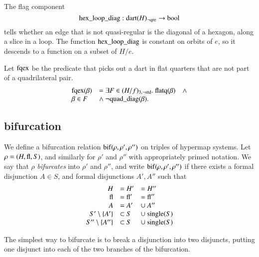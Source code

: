 \begin{definition}
The flag component
    $$
    {\operatorname{hex\_loop\_diag}}:{\operatorname{dart}}(H)_{\neg{\operatorname{qre}}}\to\operatorname{bool}
    $$
tells whether an edge that is not quasi-regular is the diagonal of
a hexagon, along a slice in a loop.  The function
${\operatorname{hex\_loop\_diag}}$ is constant on orbits of $e$, so it
descends to a function on a subset of $H/e$.
\end{definition}


\begin{definition}[$\op{fqex}$]
Let $\op{fqex}$ be the predicate that picks out a dart in flat
quarters that are not part of a quadrilateral pair.
\begin{equation}
    \begin{array}{llll}
    \op{fqex}(\beta) &= \exists F\in(H/f)_{3,\neg\op{std}}.\ \op{flatq}(\beta) &\wedge\\
        \beta\in F &\wedge
        \ \neg\op{quad\_diag}(\beta).
    \end{array}
\end{equation}
\end{definition}




\subsection{bifurcation}



\begin{definition}
We define a bifurcation relation ${\operatorname{bif}}(\rho,\rho',\rho'')$ on
triples of  hypermap systems.  Let $\rho=(H,{\operatorname{fl}},S)$, and
similarly for $\rho'$ and $\rho''$ with appropriately primed
notation.  We say that $\rho$ {\it bifurcates} into $\rho'$ and
$\rho''$, and write ${\operatorname{bif}}(\rho,\rho',\rho'')$ if there exists
a formal disjunction $A\in S$, and formal disjunctions $A',A''$
such that
    $$
    \begin{array}{rlll}
    H &= H' &= H''\\
    {\operatorname{fl}} &= {\operatorname{fl}}' &= {\operatorname{fl}}''\\
        A &= A'&\cup\ A''\\
    S'\setminus  \{A'\} &\subset S &\cup\ {\operatorname{single}}(S)\\
    S''\setminus  \{A''\} &\subset S&\cup\ {\operatorname{single}}(S)\\
    \end{array}
    $$
\end{definition}
The simplest way to bifurcate is to break a disjunction into two
disjuncts, putting one disjunct into each of the two branches of
the bifurcation.



